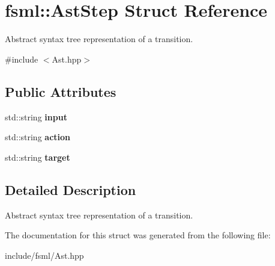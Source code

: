 \hypertarget{structfsml_1_1AstStep}{\section{fsml\-:\-:Ast\-Step Struct Reference}
\label{structfsml_1_1AstStep}
}


Abstract syntax tree representation of a transition.  




{\ttfamily \#include $<$Ast.\-hpp$>$}

\subsection*{Public Attributes}
\begin{DoxyCompactItemize}
\item 
\hypertarget{structfsml_1_1AstStep_a2244e46f2cff2fa65fda13931a377356}{std\-::string {\bfseries input}}\label{structfsml_1_1AstStep_a2244e46f2cff2fa65fda13931a377356}

\item 
\hypertarget{structfsml_1_1AstStep_a308747ad3a3acc808f6c654ff1942e96}{std\-::string {\bfseries action}}\label{structfsml_1_1AstStep_a308747ad3a3acc808f6c654ff1942e96}

\item 
\hypertarget{structfsml_1_1AstStep_ac7eb1fb884326a326da14c054d3f7777}{std\-::string {\bfseries target}}\label{structfsml_1_1AstStep_ac7eb1fb884326a326da14c054d3f7777}

\end{DoxyCompactItemize}


\subsection{Detailed Description}
Abstract syntax tree representation of a transition. 



The documentation for this struct was generated from the following file\-:\begin{DoxyCompactItemize}
\item 
include/fsml/Ast.\-hpp\end{DoxyCompactItemize}
